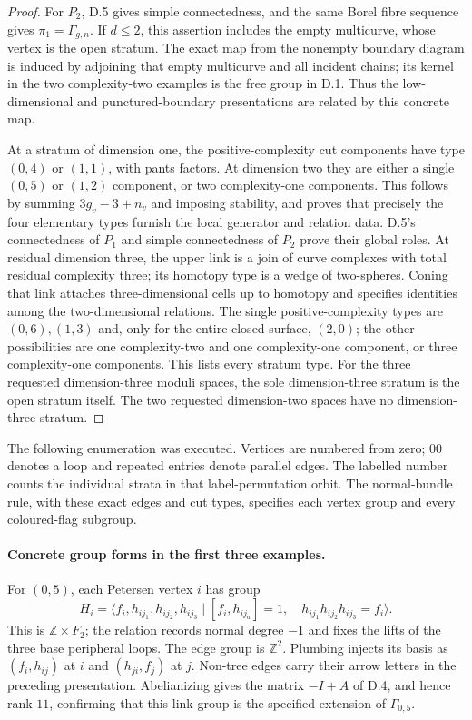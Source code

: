 \begin{proof}
For $P_2$, D.5 gives simple connectedness, and the same Borel fibre sequence gives $\pi_1=\Gamma_{g,n}$. If $d\leq2$, this assertion includes the empty multicurve, whose vertex is the open stratum. The exact map from the nonempty boundary diagram is induced by adjoining that empty multicurve and all incident chains; its kernel in the two complexity-two examples is the free group in D.1. Thus the low-dimensional and punctured-boundary presentations are related by this concrete map.

At a stratum of dimension one, the positive-complexity cut components have type $(0,4)$ or $(1,1)$, with pants factors. At dimension two they are either a single $(0,5)$ or $(1,2)$ component, or two complexity-one components. This follows by summing $3g_v-3+n_v$ and imposing stability, and proves that precisely the four elementary types furnish the local generator and relation data. D.5's connectedness of $P_1$ and simple connectedness of $P_2$ prove their global roles. At residual dimension three, the upper link is a join of curve complexes with total residual complexity three; its homotopy type is a wedge of two-spheres. Coning that link attaches three-dimensional cells up to homotopy and specifies identities among the two-dimensional relations. The single positive-complexity types are $(0,6),(1,3)$ and, only for the entire closed surface, $(2,0)$; the other possibilities are one complexity-two and one complexity-one component, or three complexity-one components. This lists every stratum type. For the three requested dimension-three moduli spaces, the sole dimension-three stratum is the open stratum itself. The two requested dimension-two spaces have no dimension-three stratum.
\end{proof}

The following enumeration was executed. Vertices are numbered from zero; $00$ denotes a loop and repeated entries denote parallel edges. The labelled number counts the individual strata in that label-permutation orbit. The normal-bundle rule, with these exact edges and cut types, specifies each vertex group and every coloured-flag subgroup.

{\small}

\paragraph{Concrete group forms in the first three examples.}
For $(0,5)$, each Petersen vertex $i$ has group
\[
 H_i=\langle f_i,h_{ij_1},h_{ij_2},h_{ij_3}\mid
 [f_i,h_{ij_a}]=1,\quad h_{ij_1}h_{ij_2}h_{ij_3}=f_i\rangle.
\]
This is $\mathbb Z\times F_2$; the relation records normal degree $-1$ and fixes the lifts of the three base peripheral loops. The edge group is $\mathbb Z^2$. Plumbing injects its basis as $(f_i,h_{ij})$ at $i$ and $(h_{ji},f_j)$ at $j$. Non-tree edges carry their arrow letters in the preceding presentation. Abelianizing gives the matrix $-I+A$ of D.4, and hence rank $11$, confirming that this link group is the specified extension of $\Gamma_{0,5}$.

